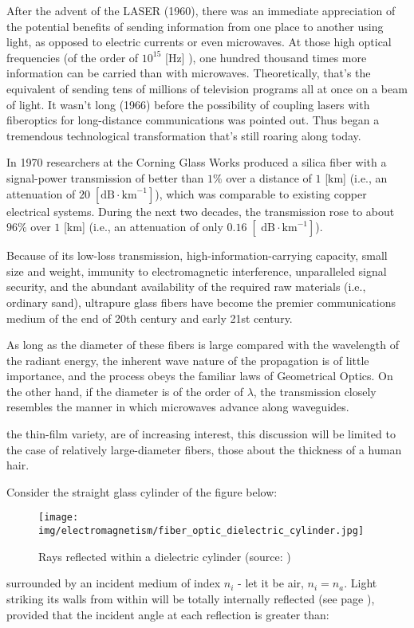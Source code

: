 	After the advent of the LASER (1960), there was an immediate appreciation of the potential benefits of sending information from one place to another using light, as opposed to electric currents or even microwaves. At those high optical frequencies (of the order of $10^{15}$ [Hz] ), one hundred thousand times more information can be carried than with microwaves. Theoretically, that's the equivalent of sending tens of millions of television programs all at once on a beam of light. It wasn't long (1966) before the possibility of coupling lasers with fiberoptics for long-distance communications was pointed out. Thus began a tremendous technological transformation that's still roaring along today.

	In 1970 researchers at the Corning Glass Works produced a silica fiber with a signal-power transmission of better than $1 \%$ over a distance of $1$ [km] (i.e., an attenuation of $20\;[\text{dB}\cdot \text{km}^{-1}]$), which was comparable to existing copper electrical systems. During the next two decades, the transmission rose to about $96 \%$ over $1$ [km] (i.e., an attenuation of only $0.16\; [\text{~dB}\cdot \text{km}^{-1}]$).

	Because of its low-loss transmission, high-information-carrying capacity, small size and weight, immunity to electromagnetic interference, unparalleled signal security, and the abundant availability of the required raw materials (i.e., ordinary sand), ultrapure glass fibers have become the premier communications medium of the end of 20th century and early 21st century.

	As long as the diameter of these fibers is large compared with the wavelength of the radiant energy, the inherent wave nature of the propagation is of little importance, and the process obeys the familiar laws of Geometrical Optics. On the other hand, if the diameter is of the order of $\lambda$, the transmission closely resembles the manner in which microwaves advance along waveguides. 
	
	the thin-film variety, are of increasing interest, this discussion will be limited to the case of relatively large-diameter fibers, those about the thickness of a human hair.

	Consider the straight glass cylinder of the figure below:
	\begin{figure}[H]
		\centering
		\texttt{[image: img/electromagnetism/fiber\_optic\_dielectric\_cylinder.jpg]}
		\caption[Rays reflected within a dielectric cylinder]{Rays reflected within a dielectric cylinder (source: \cite{hecht2016optics})}
	\end{figure} 	
	surrounded by an incident medium of index $n_{i}$ - let it be air, $n_{i}=n_{a}$. Light striking its walls from within will be totally internally reflected (see page \pageref{total reflection}), provided that the incident angle at each reflection is greater than:
	
